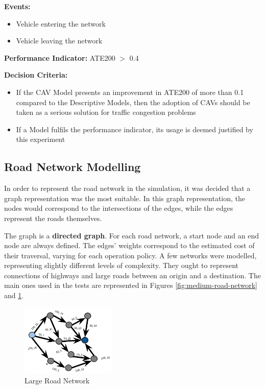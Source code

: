\textbf{Events:}
\begin{itemize}
    \item Vehicle entering the network
    \item Vehicle leaving the network
\end{itemize}

\textbf{Performance Indicator:} ATE200 $>$ 0.4

\textbf{Decision Criteria:}
\begin{itemize}
    \item If the CAV Model presents an improvement in ATE200 of more than 0.1 compared to the Descriptive Models, then the adoption of CAVs should be taken as a serious solution for traffic congestion problems
    \item If a Model fulfils the performance indicator, its usage is deemed justified by this experiment
\end{itemize}

\subsection{Road Network Modelling}

In order to represent the road network in the simulation, it was decided that a graph representation was the most suitable. In this graph representation, the nodes would correspond to the intersections of the edges, while the edges represent the roads themselves. 

The graph is a \textbf{directed graph}. For each road network, a start node and an end node are always defined. The edges' weights correspond to the estimated cost of their traversal, varying for each operation policy. A few networks were modelled, representing slightly different levels of complexity. They ought to represent connections of highways and large roads between an origin and a destination. The main ones used in the tests are represented in Figures \ref{fig:medium-road-network} and \ref{fig:large-road-network}.

\begin{figure}
    \centering
    \includegraphics[width=0.4\textwidth]{img/large.png}
    \caption{Large Road Network}
    \label{fig:large-road-network}
\end{figure}

